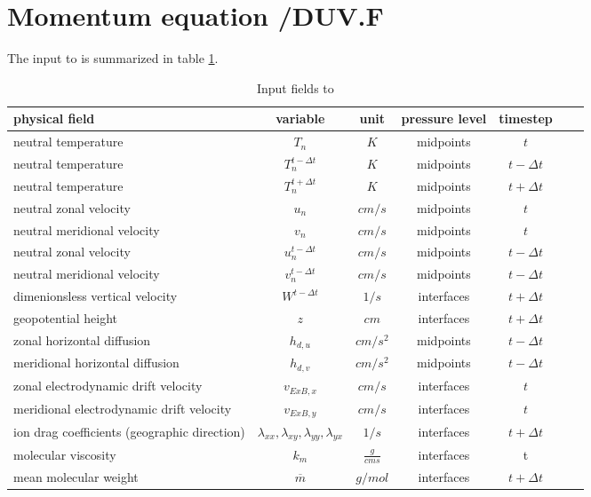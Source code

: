 %
\section{Momentum equation /DUV.F }\label{cap:duv}
%
The input to  is summarized in table
\ref{tab:input_duv}.
%
\begin{table}[tb]
\begin{tabular}{|p{3.5cm} ||c|c|c|c|c|c|} \hline
physical field               & variable        & unit&pressure
level& timestep
\\ \hline \hline
%
neutral temperature &       $T_n$              & $K$   &  midpoints & $t$\\
neutral temperature &       $T_n^{t-\Delta t}$ & $K$   &  midpoints & $t-\Delta t$\\
neutral temperature &       $T_n^{t+\Delta t}$ & $K$   &  midpoints & $t+\Delta t$\\
neutral zonal velocity&     $u_n$     & $cm/s$   &  midpoints & $t$\\
neutral meridional velocity & $v_n$   & $cm/s$   &  midpoints & $t$\\
neutral zonal velocity&     {$u_n^{t-\Delta t}$} & $cm/s$& midpoints & $t-\Delta t$\\
neutral meridional velocity&{$v_n^{t-\Delta t}$} & $cm/s$& midpoints & $t-\Delta t$\\
dimenionsless vertical velocity& $W^{t-\Delta t}$& $1/s$   & interfaces& $t+\Delta t$ \\
geopotential height&  $z$     & $cm$   & interfaces  & $t+\Delta t$\\
zonal horizontal diffusion&       {$h_{d,u}$}     & $cm/s^2$   & midpoints  & $t-\Delta t$\\
meridional horizontal diffusion& {$h_{d,v}$}     & $cm/s^2$   & midpoints  & $t-\Delta t$ \\
zonal electrodynamic drift velocity&       {$v_{ExB,x}$}     & $cm/s$   & interfaces  & $t$ \\
meridional electrodynamic drift velocity&  {$v_{ExB,y}$}     & $cm/s$   & interfaces  & $t$ \\
ion drag coefficients (geographic direction)&       $\lambda_{xx},\lambda_{xy},\lambda_{yy},\lambda_{yx}$ & $1/s$   & interfaces  & $t + \Delta t$ \\
molecular viscosity&       $k_m$     & $\frac{g}{cm s}$   & interfaces  & t \\
mean molecular weight&       {$\overline{m}$}     & $g/mol$ &
interfaces  &$t + \Delta t$
 \\ \hline
\end{tabular}
\caption{Input fields to } \label{tab:input_duv}
\end{table}
